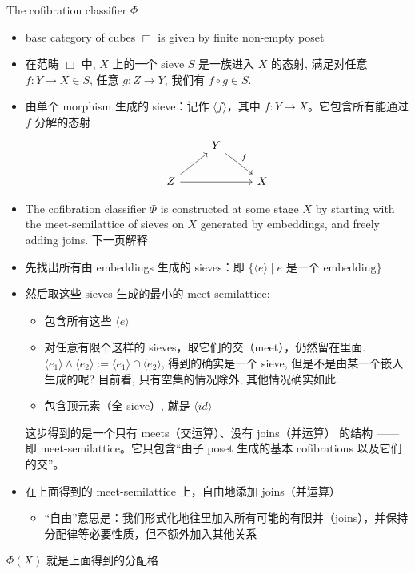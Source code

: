 \documentclass{beamer}
\begin{document}
\begin{frame}{The cofibration classifier $Φ$}
\begin{itemize}
    \item base category of cubes $\Box$ is given by finite non-empty poset
    \item 在范畴 $\Box$ 中, $X$ 上的一个 sieve $S$ 是一族进入 $X$ 的态射, 满足对任意 $f : Y \to X \in S$, 任意 $g : Z \to Y$, 我们有 $f \circ g \in S$.
    \item 由单个 morphism 生成的 sieve：记作 $\langle f \rangle$，其中 $f: Y \to X$。它包含所有能通过 $f$ 分解的态射
    \[
    \begin{tikzcd}
      & Y \arrow[dr,"f"] & \\
    Z \arrow[ur] \arrow[rr] & & X
    \end{tikzcd}
    \]
    \item The cofibration classifier $Φ$ is constructed at some stage $X$ by starting with the meet-semilattice of sieves on $X$ generated by embeddings, and freely adding joins. 下一页解释
\end{itemize}
\end{frame}

\begin{frame}
\begin{itemize}
  \item 先找出所有由 embeddings 生成的 sieves：即 $\{ \langle e \rangle \mid e \text{ 是一个 embedding} \}$
  \item 然后取这些 sieves 生成的最小的 meet-semilattice:
    \begin{itemize}
        \item 包含所有这些 $  \langle e \rangle  $
        \item 对任意有限个这样的 sieves，取它们的交（meet），仍然留在里面. $\langle e_1\rangle \land \langle e_2\rangle := \langle e_1\rangle \cap \langle e_2\rangle$, 得到的确实是一个 sieve, 但是不是由某一个嵌入生成的呢? 目前看, 只有空集的情况除外, 其他情况确实如此.
        \item 包含顶元素（全 sieve）, 就是 $\langle id\rangle$
    \end{itemize}
    这步得到的是一个只有 meets（交运算）、没有 joins（并运算） 的结构 —— 即 meet-semilattice。它只包含“由子 poset 生成的基本 cofibrations 以及它们的交”。
  \item 在上面得到的 meet-semilattice 上，自由地添加 joins（并运算）
    \begin{itemize}
        \item “自由”意思是：我们形式化地往里加入所有可能的有限并（joins），并保持分配律等必要性质，但不额外加入其他关系
    \end{itemize}
\end{itemize}

\vspace{5mm}
$\Phi(X)$ 就是上面得到的分配格
\end{frame}
\end{document}
